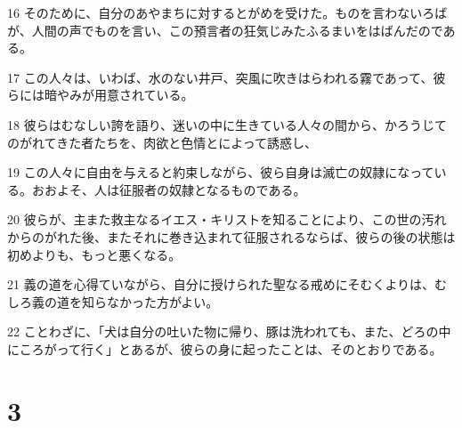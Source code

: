\par 16 そのために、自分のあやまちに対するとがめを受けた。ものを言わないろばが、人間の声でものを言い、この預言者の狂気じみたふるまいをはばんだのである。
\par 17 この人々は、いわば、水のない井戸、突風に吹きはらわれる霧であって、彼らには暗やみが用意されている。
\par 18 彼らはむなしい誇を語り、迷いの中に生きている人々の間から、かろうじてのがれてきた者たちを、肉欲と色情とによって誘惑し、
\par 19 この人々に自由を与えると約束しながら、彼ら自身は滅亡の奴隷になっている。おおよそ、人は征服者の奴隷となるものである。
\par 20 彼らが、主また救主なるイエス・キリストを知ることにより、この世の汚れからのがれた後、またそれに巻き込まれて征服されるならば、彼らの後の状態は初めよりも、もっと悪くなる。
\par 21 義の道を心得ていながら、自分に授けられた聖なる戒めにそむくよりは、むしろ義の道を知らなかった方がよい。
\par 22 ことわざに、「犬は自分の吐いた物に帰り、豚は洗われても、また、どろの中にころがって行く」とあるが、彼らの身に起ったことは、そのとおりである。

\chapter{3}

